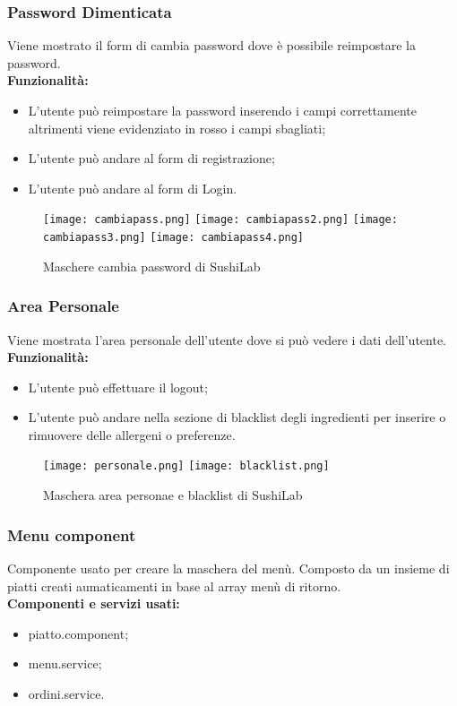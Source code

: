 \subsubsection{Password Dimenticata}
Viene mostrato il form di cambia password dove è possibile reimpostare la password.\\
\textbf{Funzionalità:}
\begin{itemize}
    \setlength\itemsep{.1em}
    \item L'utente può reimpostare la password inserendo i campi correttamente altrimenti viene evidenziato in rosso i campi sbagliati;
    \item L'utente può andare al form di registrazione;
    \item L'utente può andare al form di Login.
\end{itemize}
\begin{figure}[H]
    \centering
    \texttt{[image: cambiapass.png]}
    \texttt{[image: cambiapass2.png]}
    \texttt{[image: cambiapass3.png]}
    \texttt{[image: cambiapass4.png]}
    \caption{Maschere cambia password di SushiLab}
\end{figure}


\subsubsection{Area Personale}
Viene mostrata l'area personale dell'utente dove si può vedere i dati dell'utente.
\textbf{Funzionalità:}
\begin{itemize}
    \item L'utente può effettuare il logout;
    \item L'utente può andare nella sezione di blacklist degli ingredienti per inserire o rimuovere delle allergeni o preferenze.
\end{itemize}
\begin{figure}[H]
    \centering
    \texttt{[image: personale.png]}
    \texttt{[image: blacklist.png]}
    \caption{Maschera area personae e blacklist di SushiLab}
\end{figure}
\label{cap:menu.component}

\subsubsection{Menu component}
Componente usato per creare la maschera del menù. Composto da un insieme di piatti creati aumaticamenti in base al array menù di ritorno.\\
\textbf{Componenti e servizi usati:}
\begin{itemize}
    \item piatto.component;
    \item menu.service;
    \item ordini.service.
\end{itemize}


